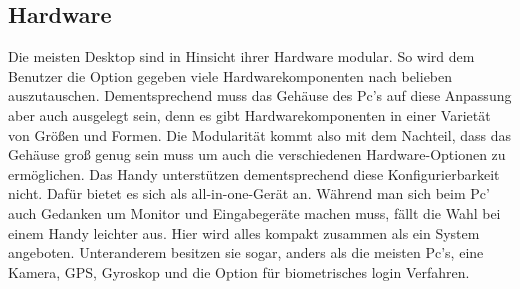 \subsection{Hardware}\myCheckmark
Die meisten Desktop sind in Hinsicht ihrer Hardware modular. %
	So wird dem Benutzer die Option gegeben viele Hardwarekomponenten nach belieben auszutauschen. %
	Dementsprechend muss das Gehäuse des Pc's auf diese Anpassung aber auch ausgelegt sein, denn es gibt Hardwarekomponenten in einer Varietät von Größen und Formen. Die Modularität kommt also mit dem Nachteil, dass das Gehäuse groß genug sein muss um auch die verschiedenen Hardware-Optionen zu ermöglichen.\newline%
Das Handy unterstützen dementsprechend diese Konfigurierbarkeit nicht. Dafür bietet es sich als all-in-one-Gerät an. %
	Während man sich beim Pc' auch Gedanken um Monitor und Eingabegeräte machen muss, fällt die Wahl bei einem Handy leichter aus. Hier wird alles kompakt zusammen als ein System angeboten. Unteranderem besitzen sie sogar, anders als die meisten Pc's, eine Kamera, GPS, Gyroskop und die Option für biometrisches login Verfahren.\newline%
	
	
	
